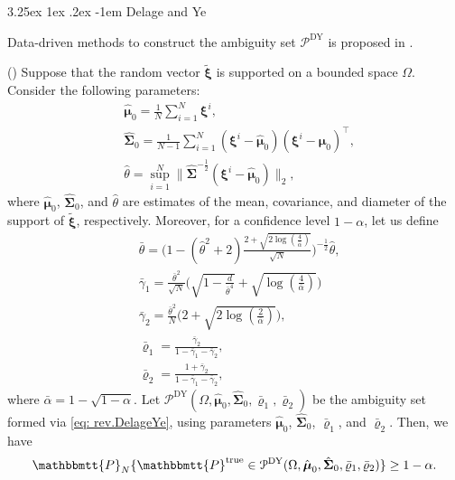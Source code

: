 \documentclass[final,onefignum,onetabnum]{class}
\makeatletter
\renewcommand\paragraph{\@startsection{paragraph}{4}{\z@}%
  {3.25ex \@plus1ex \@minus.2ex}%
  {-1em}%
  {\normalfont\normalsize\bfseries}}
\newcommand{\bs}[1]{\boldsymbol{#1}} %
\newcommand{\Ts}[1]{\mathbbmtt{#1}} %
\newcommand{\Cs}[1]{\mathcal{#1}} %
\newcommand{\txi}{\tilde{\bs{\xi}}}
\newcommand{\trueP}{\Ts{P}^{\text{true}}}
\makeatother
\begin{document}
\paragraph{Delage and Ye}

Data-driven methods to construct the ambiguity set $\Cs{P}^{\text{DY}}$ is proposed in \citet{delage2010}. 

\begin{theorem}{(\citet[Corollary~4]{delage2010})}
    \label{thm: rev.DelageYe.calibrration}
    Suppose that the random vector $\txi$ is supported on a bounded  space $\Omega$. Consider the following parameters:
    \begin{align*}
        & \hat{\bs{\mu}}_{0}=\frac{1}{N} \sum_{i=1}^{N} \bs{\xi}^{i},\\
        & \hat{\bs{\Sigma}}_{0}=\frac{1}{N-1}  \sum_{i=1}^{N} (\bs{\xi}^{i}- \hat{\bs{\mu}}_{0})(\bs{\xi}^{i}- \hat{\bs{\mu}}_{0})^{\top},\\
        & \hat{\theta}= \sup_{i=1}^{N} \|\hat{\bs{\Sigma}}^{-\frac{1}{2}} (\bs{\xi}^{i}- \hat{\bs{\mu}}_{0})\|_{2},
    \end{align*}
    where $\hat{\bs{\mu}}_{0}$, $\hat{\bs{\Sigma}}_{0}$, and $\hat{\theta}$ are  estimates of the mean, covariance, and diameter of the support of $\txi$, respectively. 
    Moreover, for a confidence level $1-\alpha$, let us define
    \begin{align*}
        & \bar{\theta}=\Big( 1- (\hat{\theta}^{2}+2) \frac{2 + \sqrt{2 \log (\frac{4}{\bar{\alpha}})}}{\sqrt{N}}\Big)^{-\frac{1}{2}} \hat{\theta},\\
        & \bar{\gamma}_{1}= \frac{\bar{\theta}^{2}}{\sqrt{N}} \Big( \sqrt{1- \frac{d}{\bar{\theta}^{4}}} + \sqrt{\log{(\frac{4}{\bar{\alpha}})}} \Big)\\
        & \bar{\gamma}_{2}=\frac{\bar{\theta}^{2}}{N} \Big( 2 + \sqrt{2 \log{(\frac{2}{\bar{\alpha}})}}\Big),\\
        & \bar{\varrho}_{1}= \frac{\bar{\gamma}_{2}}{1- \bar{\gamma}_{1}- \bar{\gamma}_{2}},\\
        & \bar{\varrho}_{2}= \frac{1+ \bar{\gamma}_{2}}{1- \bar{\gamma}_{1}- \bar{\gamma}_{2}},
    \end{align*}
    where  $\bar{\alpha}=1- \sqrt{1-\alpha}$. 
    Let $\Cs{P}^{\text{DY}}(\Omega, \hat{\bs{\mu}}_{0}, \hat{\bs{\Sigma}}_{0}, \bar{\varrho}_{1}, \bar{\varrho}_{2})$ be the ambiguity set formed via \eqref{eq: rev.DelageYe}, using parameters $\hat{\bs{\mu}}_{0}$, $\hat{\bs{\Sigma}}_{0}$, $\bar{\varrho}_{1}$, and $\bar{\varrho}_{2}$. 
    Then, we have $$\Ts{P}_{N}\{\trueP \in \Cs{P}^{\text{DY}}(\Omega, \hat{\bs{\mu}}_{0}, \hat{\bs{\Sigma}}_{0}, \bar{\varrho}_{1}, \bar{\varrho}_{2})\} \ge 1- \alpha.$$
\end{theorem}
\end{document}
